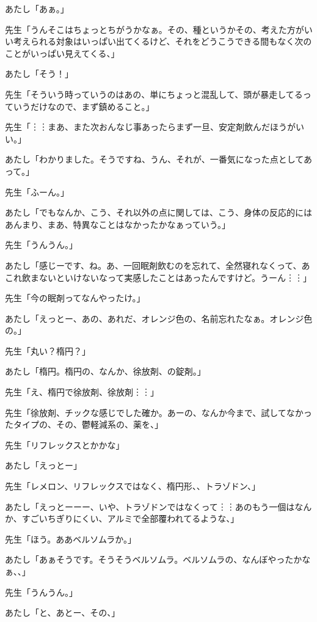 \documentclass[b5j,twoside,twocolumn]{utarticle}
\begin{document}
\begin{description}
\item あたし「あぁ。」
\item 先生「うんそこはちょっとちがうかなぁ。その、種というかその、考えた方がいい考えられる対象はいっぱい出てくるけど、それをどうこうできる間もなく次のことがいっぱい見えてくる、」
\item あたし「そう！」
\item 先生「そういう時っていうのはあの、単にちょっと混乱して、頭が暴走してるっていうだけなので、まず鎮めること。」
\item 先生「︙︙まあ、また次おんなじ事あったらまず一旦、安定剤飲んだほうがいい。」
\item あたし「わかりました。そうですね、うん、それが、一番気になった点としてあって。」
\item 先生「ふーん。」
\item あたし「でもなんか、こう、それ以外の点に関しては、こう、身体の反応的にはあんまり、まあ、特異なことはなかったかなぁっていう。」
\item 先生「うんうん。」
\item あたし「感じーです、ね。あ、一回眠剤飲むのを忘れて、全然寝れなくって、あこれ飲まないといけないなって実感したことはあったんですけど。うーん︙︙」
\item 先生「今の眠剤ってなんやったけ。」
\item あたし「えっとー、あの、あれだ、オレンジ色の、名前忘れたなぁ。オレンジ色の。」
\item 先生「丸い？楕円？」
\item あたし「楕円。楕円の、なんか、徐放剤、の錠剤。」
\item 先生「え、楕円で徐放剤、徐放剤︙︙」
\item 先生「徐放剤、チックな感じでした確か。あーの、なんか今まで、試してなかったタイプの、その、鬱軽減系の、薬を、」
\item 先生「リフレックスとかかな」
\item あたし「えっとー」
\item 先生「レメロン、リフレックスではなく、楕円形、、トラゾドン、」
\item あたし「えっとーーー、いや、トラゾドンではなくって︙︙あのもう一個はなんか、すごいちぎりにくい、アルミで全部覆われてるような、」
\item 先生「ほう。ああベルソムラか。」
\item あたし「あぁそうです。そうそうベルソムラ。ベルソムラの、なんぼやったかなぁ、、」
\item 先生「うんうん。」
\item あたし「と、あとー、その、」

\end{description}
\end{document}
